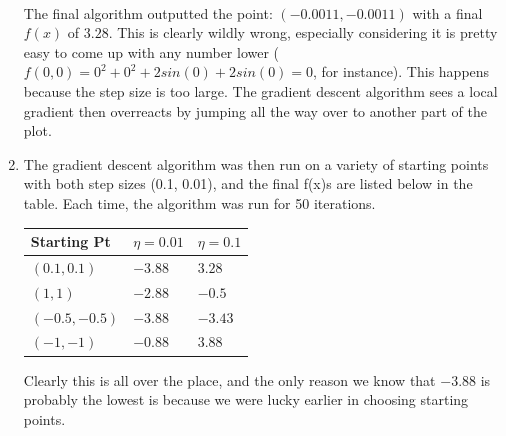 \documentclass[12pt]{article}
\begin{document}
\begin{enumerate}[label=(\alph*)]
	\\ The final algorithm outputted the point: $\boldsymbol{(-0.0011, -0.0011)}$ with a final $f(x)$ of $\boldsymbol{3.28}$. This is clearly wildly wrong, especially considering it is pretty easy to come up with any number lower ($f(0, 0) = 0^2 + 0^2 + 2 sin(0) + 2 sin(0) = 0$, for instance). This happens because the step size is too large. The gradient descent algorithm sees a local gradient then overreacts by jumping all the way over to another part of the plot.
	\item The gradient descent algorithm was then run on a variety of starting points with both step sizes (0.1, 0.01), and the final f(x)s are listed below in the table. Each time, the algorithm was run for 50 iterations.
	\begin{center}
		\begin{tabular}{| l | l | l |}
			\hline
			\textbf{Starting Pt} & $\eta = \boldsymbol{0.01}$ & $\eta = \boldsymbol{0.1}$ \\ \hline
			$(0.1, 0.1)$ & $-3.88$ & $3.28$ \\ \hline
			$(1, 1)$ & $-2.88$ & $-0.5$ \\ \hline
			$(-0.5, -0.5)$ & $-3.88$ & $-3.43$ \\ \hline
			$(-1, -1)$ & $-0.88$ & $3.88$ \\
			\hline
		\end{tabular}
	\end{center}
	Clearly this is all over the place, and the only reason we know that $-3.88$ is probably the lowest is because we were lucky earlier in choosing starting points.
\end{enumerate}
\end{document}
